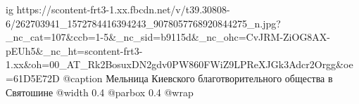  
 
 
 
 

\ifcmt
  ig https://scontent-frt3-1.xx.fbcdn.net/v/t39.30808-6/262703941_1572784416394243_9078057768920844275_n.jpg?_nc_cat=107&ccb=1-5&_nc_sid=b9115d&_nc_ohc=CvJRM-ZiOG8AX-pEUh5&_nc_ht=scontent-frt3-1.xx&oh=00_AT_Rk2BosuxDN2gdv0PW860FWiZ9LPReXJGk3Adcr2Orgg&oe=61D5E72D
  @caption Мельница Киевского благотворительного общества в Святошине
  @width 0.4
  @parbox 0.4
  @wrap \parpic[r]
\fi
